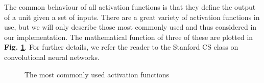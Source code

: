 \noindent The common behaviour of all activation functions is that they define the output of a unit given a set of inputs. There are a great variety of activation functions in use, but we will only describe those most commonly used and thus considered in our implementation. The mathematical function of three of these are plotted in \textbf{Fig. \ref{activationfuncs}}. For further details, we refer the reader to the Stanford CS class on convolutional neural networks\cite{cs231n_part1}. \\
\begin{figure}[H]
    \begin{minipage}{0.3\textwidth}
    \end{minipage}
    \begin{minipage}{0.3\textwidth}
    \end{minipage}
    \begin{minipage}{0.3\textwidth}
    \end{minipage}
    \caption{The most commonly used activation functions}
    \label{activationfuncs}
\end{figure}


